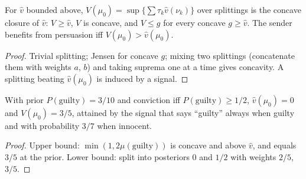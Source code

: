 \begin{theorem}
\label{thm:info-concav}
\leanok
{}
For $\hat v$ bounded above, $V(\mu_0)=\sup\{\sum\tau_k\hat v(\nu_k)\}$ over splittings is the concave closure of $\hat v$:
$V\ge\hat v$, $V$ is concave, and $V\le g$ for every concave $g\ge\hat v$. The sender benefits from persuasion iff
$V(\mu_0)>\hat v(\mu_0)$.
\end{theorem}
\begin{proof}
\leanok
Trivial splitting; Jensen for concave $g$; mixing two splittings (concatenate them with weights $a$, $b$) and taking
suprema one at a time gives concavity. A splitting beating $\hat v(\mu_0)$ is induced by a signal.
\end{proof}

\begin{theorem}
\label{thm:info-prosecutor}
\leanok
{}
With prior $P(\text{guilty})=3/10$ and conviction iff $P(\text{guilty})\ge1/2$, $\hat v(\mu_0)=0$ and $V(\mu_0)=3/5$,
attained by the signal that says ``guilty'' always when guilty and with probability $3/7$ when innocent.
\end{theorem}
\begin{proof}
\leanok
Upper bound: $\min(1,2\mu(\text{guilty}))$ is concave and above $\hat v$, and equals $3/5$ at the prior. Lower bound:
split into posteriors $0$ and $1/2$ with weights $2/5$, $3/5$.
\end{proof}

